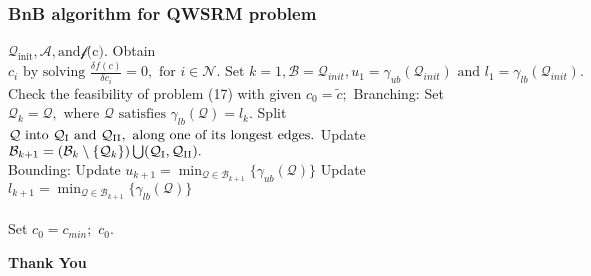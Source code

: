 \documentclass[usenames,dvipsnames]{beamer}
\begin{document}
\begin{frame}[fragile]
  \frametitle{BnB algorithm for QWSRM problem}
  \vspace*{-1\baselineskip}
  \footnotesize
  \begin{block}{}
        \begin{algorithmic}

	  \Input $\mathcal{Q}_{\text{init}}, \mathcal{A}, \text{and} \mathcal{f} \text{(c)}.$
	  \Initialize Obtain $c_{i} \text{ by solving } \frac{\delta f(c)}{\delta c_{i}}=0, \text{ for } i\in\mathcal{N}.\text{ Set } k = 1, \mathcal{B} = \mathcal{Q}_{init},u_{1}=\gamma_{ub}(\mathcal{Q}_{init}) \text{ and } l_{1} = \gamma_{lb}(\mathcal{Q}_{init}).$\\
	  Check the feasibility of problem (17) with given
	  \State $c_{0} = \widetilde{c};$
	  \Else
	  \State Branching:
\State\quad{} Set $\mathcal{Q}_{k} = \mathcal{Q}, \text{ where } \mathcal{Q} \text{ satisfies } \gamma_{lb}(\mathcal{Q}) = l_{k}.$
	  \State\quad{} Split $\mathcal{Q} \text{ into } \mathcal{Q}_{\rm{I}} \text{ and } \mathcal{Q}_{\rm{II}}, \text{ along one of its longest edges.}$
	     \State\quad{} Update $\mathcal{B}_{k+1} = (\mathcal{B}_{k}\setminus{\{\mathcal{Q}_{k}\}})\bigcup(\mathcal{Q}_{\rm{I}}, \mathcal{Q}_{\rm{II}}).$\\
	  \State Bounding:
	    \State\quad{} Update $u_{k+1} = \min_{\mathcal{Q}\in\mathcal{B}_{k+1}}{\{\gamma_{ub}(\mathcal{Q})}\}$
\State\quad{} Update $l_{k+1} = \min_{\mathcal{Q}\in\mathcal{B}_{k+1}}{\{\gamma_{lb}(\mathcal{Q})}\}$\\
	  \EndWhile\\
	  Set $c_{0} = c_{min};$
	  \EndIf
	  \Output $c_{0}.$
        \end{algorithmic}
    \end{block}
\end{frame}
\begin{frame}
  \color{Sepia}
  \centering \Huge\textbf{Thank You}
\end{frame}
\end{document}
